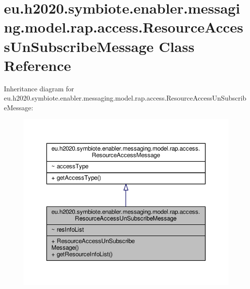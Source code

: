 \hypertarget{classeu_1_1h2020_1_1symbiote_1_1enabler_1_1messaging_1_1model_1_1rap_1_1access_1_1ResourceAccessUnSubscribeMessage}{}\section{eu.\+h2020.\+symbiote.\+enabler.\+messaging.\+model.\+rap.\+access.\+Resource\+Access\+Un\+Subscribe\+Message Class Reference}
\label{classeu_1_1h2020_1_1symbiote_1_1enabler_1_1messaging_1_1model_1_1rap_1_1access_1_1ResourceAccessUnSubscribeMessage}


Inheritance diagram for eu.\+h2020.\+symbiote.\+enabler.\+messaging.\+model.\+rap.\+access.\+Resource\+Access\+Un\+Subscribe\+Message\+:
\nopagebreak
\begin{figure}[H]
\begin{center}
\leavevmode
\includegraphics[width=346pt]{classeu_1_1h2020_1_1symbiote_1_1enabler_1_1messaging_1_1model_1_1rap_1_1access_1_1ResourceAccesse17afe76834b849dfecc8fcfa1958325}
\end{center}
\end{figure}


